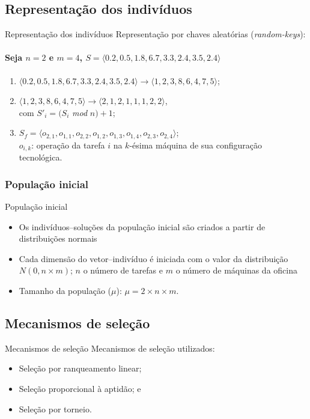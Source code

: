 \documentclass{beamer}
\begin{document}
\subsection{Representação dos indivíduos}
\begin{frame}{Representação dos indivíduos}
Representação por chaves aleatórias (\textit{random-keys}):
\begin{center}
\paragraph{Seja $n = 2$ e $m = 4$, $S = \langle0.2, 0.5, 1.8, 6.7, 3.3, 2.4, 3.5, 2.4\rangle$}
\end{center}
\begin{enumerate}
\item<2-> $\langle0.2, 0.5, 1.8, 6.7, 3.3, 2.4, 3.5, 2.4\rangle \rightarrow \langle1, 2, 3, 8, 6, 4, 7, 5\rangle$;
\item<3-> $\langle1, 2, 3, 8, 6, 4, 7, 5\rangle \rightarrow \langle2, 1, 2, 1, 1, 1, 2, 2\rangle$,\\ com $S'_{i} = (S_{i}$ \textit{mod} $n) + 1$;
\item<4-> $S_{f} = \langle o_{2,1}, o_{1,1}, o_{2,2}, o_{1,2}, o_{1,3}, o_{1,4}, o_{2,3}, o_{2,4}\rangle$;\\
$o_{i,k}$: opera\c{c}\~{a}o da tarefa $i$ na $k$-\'{e}sima m\'{a}quina de sua configura\c{c}\~{a}o tecnol\'{o}gica.
\end{enumerate}
\end{frame}

\subsubsection{População inicial}
\begin{frame}{População inicial}
\begin{itemize}
\item<1-> Os indiv\'{i}duos--solu\c{c}\~{o}es da popula\c{c}\~{a}o inicial s\~{a}o criados a partir de distribui\c{c}\~{o}es normais
\item<2-> Cada dimens\~{a}o do vetor--indiv\'{i}duo \'{e} iniciada com o valor da distribui\c{c}\~{a}o $N(0, n \times m)$;
$n$ o n\'{u}mero de tarefas e $m$ o n\'{u}mero de m\'{a}quinas da oficina
\item<3-> Tamanho da população ($\mu$): $\mu = 2 \times n \times m$.
\end{itemize}
\end{frame}

\subsection{Mecanismos de seleção}
\begin{frame}{Mecanismos de seleção}
Mecanismos de seleção utilizados:
\begin{itemize}
\item<1-> Seleção por ranqueamento linear;
\item<2-> Seleção proporcional à aptidão; e
\item<3-> Seleção por torneio.
\end{itemize}
\end{frame}
\end{document}
